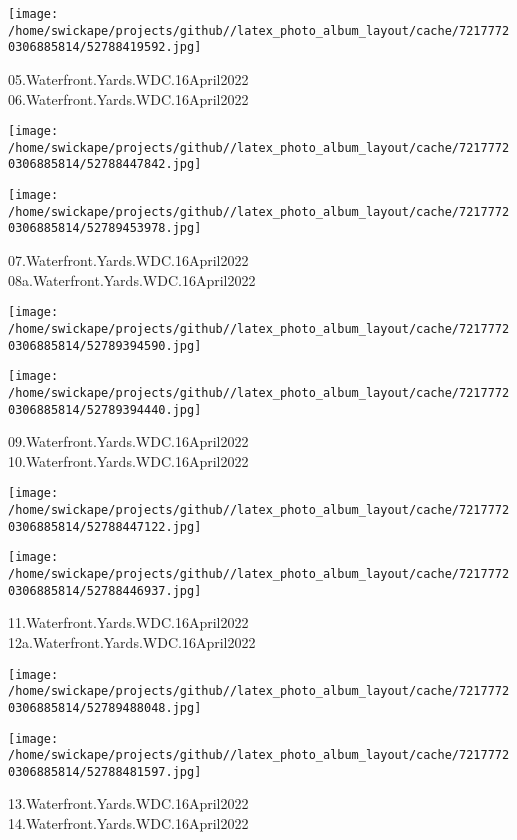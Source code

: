 \documentclass[10pt,letterpaper]{article}
\begin{document}
\vspace{0.25in}
\texttt{[image: /home/swickape/projects/github//latex\_photo\_album\_layout/cache/72177720306885814/52788419592.jpg]}

05.Waterfront.Yards.WDC.16April2022\\
06.Waterfront.Yards.WDC.16April2022
\pagebreak

\texttt{[image: /home/swickape/projects/github//latex\_photo\_album\_layout/cache/72177720306885814/52788447842.jpg]}

\vspace{0.25in}
\texttt{[image: /home/swickape/projects/github//latex\_photo\_album\_layout/cache/72177720306885814/52789453978.jpg]}

07.Waterfront.Yards.WDC.16April2022\\
08a.Waterfront.Yards.WDC.16April2022
\pagebreak

\texttt{[image: /home/swickape/projects/github//latex\_photo\_album\_layout/cache/72177720306885814/52789394590.jpg]}

\vspace{0.25in}
\texttt{[image: /home/swickape/projects/github//latex\_photo\_album\_layout/cache/72177720306885814/52789394440.jpg]}

09.Waterfront.Yards.WDC.16April2022\\
10.Waterfront.Yards.WDC.16April2022
\pagebreak

\texttt{[image: /home/swickape/projects/github//latex\_photo\_album\_layout/cache/72177720306885814/52788447122.jpg]}

\vspace{0.25in}
\texttt{[image: /home/swickape/projects/github//latex\_photo\_album\_layout/cache/72177720306885814/52788446937.jpg]}

11.Waterfront.Yards.WDC.16April2022\\
12a.Waterfront.Yards.WDC.16April2022
\pagebreak

\texttt{[image: /home/swickape/projects/github//latex\_photo\_album\_layout/cache/72177720306885814/52789488048.jpg]}

\vspace{0.25in}
\texttt{[image: /home/swickape/projects/github//latex\_photo\_album\_layout/cache/72177720306885814/52788481597.jpg]}

13.Waterfront.Yards.WDC.16April2022\\
14.Waterfront.Yards.WDC.16April2022
\pagebreak
\end{document}
